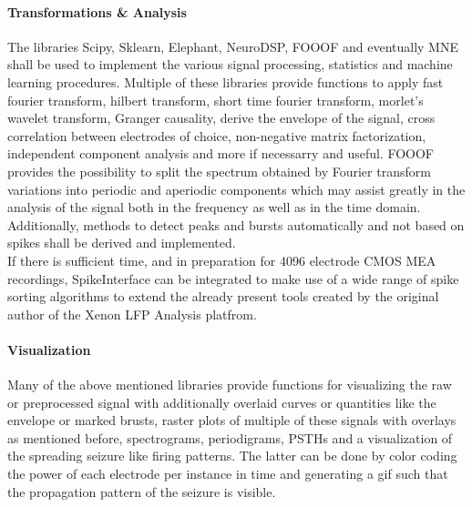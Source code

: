 \documentclass[a4paper]{article}
\begin{document}
		\paragraph{Transformations \& Analysis}
            The libraries Scipy, Sklearn, Elephant, NeuroDSP, FOOOF and eventually MNE shall be used to implement the various signal processing, statistics and machine learning procedures.
            Multiple of these libraries provide functions to apply fast fourier transform, hilbert transform, short time fourier transform, morlet's wavelet transform, Granger causality, derive the envelope of the signal, cross correlation between electrodes of choice, non-negative matrix factorization, independent component analysis and more if necessarry and useful.
            FOOOF provides the possibility to split the spectrum obtained by Fourier transform variations into periodic and aperiodic components which may assist greatly in the analysis of the signal both in the frequency as well as in the time domain.
            Additionally, methods to detect peaks and bursts automatically and not based on spikes shall be derived and implemented. \\
            If there is sufficient time, and in preparation for 4096 electrode CMOS MEA recordings, SpikeInterface can be integrated to make use of a wide range of spike sorting algorithms to extend the already present tools created by the original author of the Xenon LFP Analysis platfrom.
		
		\paragraph{Visualization}
            Many of the above mentioned libraries provide functions for visualizing the raw or preprocessed signal with additionally overlaid curves or quantities like the envelope or marked brusts, raster plots of multiple of these signals with overlays as mentioned before, spectrograms, periodigrams, PSTHs and a visualization of the spreading seizure like firing patterns. The latter can be done by color coding the power of each electrode per instance in time and generating a gif such that the propagation pattern of the seizure is visible.
            
\printbibliography
\end{document}
